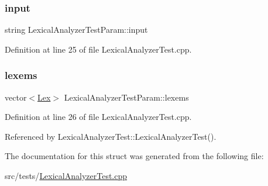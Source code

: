 \subsubsection{\texorpdfstring{input}{input}}
{\footnotesize\ttfamily string Lexical\+Analyzer\+Test\+Param\+::input}



Definition at line 25 of file Lexical\+Analyzer\+Test.\+cpp.

\mbox{\label{struct_lexical_analyzer_test_param_a4d683034767e8307cf3bc765e40c93d8}} 
\subsubsection{\texorpdfstring{lexems}{lexems}}
{\footnotesize\ttfamily vector$<$\hyperlink{classteam22_1_1_calc_1_1_lex}{Lex}$>$ Lexical\+Analyzer\+Test\+Param\+::lexems}



Definition at line 26 of file Lexical\+Analyzer\+Test.\+cpp.



Referenced by Lexical\+Analyzer\+Test\+::\+Lexical\+Analyzer\+Test().



The documentation for this struct was generated from the following file\+:\begin{DoxyCompactItemize}
\item 
src/tests/\hyperlink{_lexical_analyzer_test_8cpp}{Lexical\+Analyzer\+Test.\+cpp}\end{DoxyCompactItemize}
